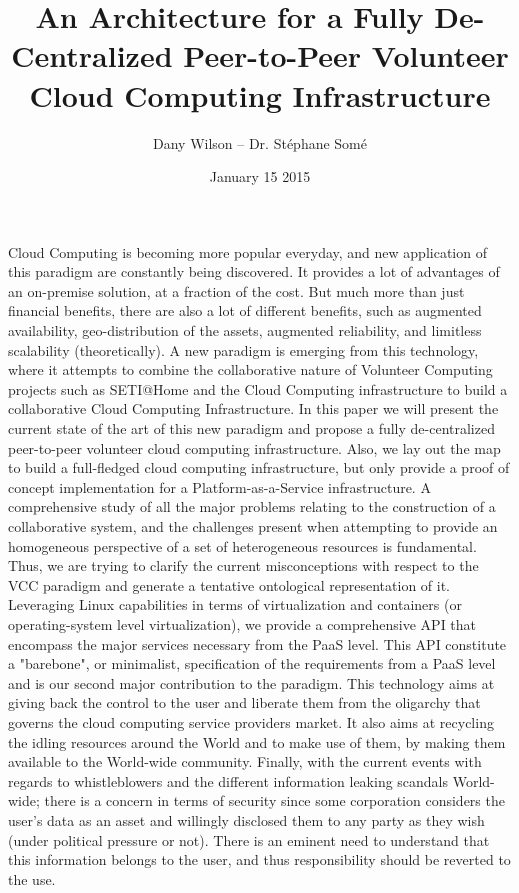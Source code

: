 \message{ !name(abstract.tex)}\documentclass{article}
\begin{document}

\title{An Architecture for a Fully De-Centralized Peer-to-Peer Volunteer Cloud Computing Infrastructure}
\author{Dany Wilson -- Dr. St\'ephane Som\'e} 
\date{January 15 2015}

\maketitle 

Cloud Computing is becoming more popular everyday, and new application of this paradigm
are constantly being discovered. It provides a lot of advantages of an on-premise
solution, at a fraction of the cost. But much more than just financial benefits, there are
also a lot of different benefits, such as augmented availability, geo-distribution of the
assets, augmented reliability, and limitless scalability (theoretically). A new paradigm
is emerging from this technology, where it attempts to combine the collaborative nature of
Volunteer Computing projects such as SETI@Home and the Cloud Computing infrastructure to
build a collaborative Cloud Computing Infrastructure. In this paper we will present the
current state of the art of this new paradigm and propose a fully de-centralized
peer-to-peer volunteer cloud computing infrastructure. Also, we lay out the map to build a
full-fledged cloud computing infrastructure, but only provide a proof of concept
implementation for a Platform-as-a-Service infrastructure. A comprehensive study of all
the major problems relating to the construction of a collaborative system, and the
challenges present when attempting to provide an homogeneous perspective of a set of
heterogeneous resources is fundamental. Thus, we are trying to clarify the current
misconceptions with respect to the VCC paradigm and generate a tentative ontological
representation of it. Leveraging Linux capabilities in terms of virtualization and
containers (or operating-system level virtualization), we provide a comprehensive API that
encompass the major services necessary from the PaaS level. This API constitute a
"barebone", or minimalist, specification of the requirements from a PaaS level and is our
second major contribution to the paradigm. This technology aims at giving back the control
to the user and liberate them from the oligarchy that governs the cloud computing service
providers market. It also aims at recycling the idling resources around the World and to
make use of them, by making them available to the World-wide community. Finally, with the
current events with regards to whistleblowers and the different information leaking
scandals World-wide; there is a concern in terms of security since some corporation
considers the user's data as an asset and willingly disclosed them to any party as they
wish (under political pressure or not). There is an eminent need to understand that this
information belongs to the user, and thus responsibility should be reverted to the use. 
\end{document}

